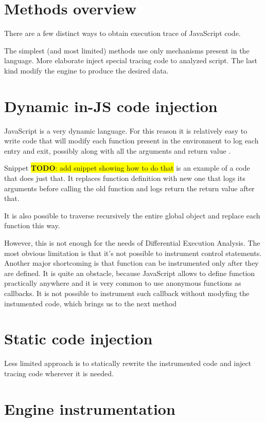 \documentclass[en]{pracamgr}
\newcommand{\todo}[1]{\colorbox{yellow}{ \color{red} \textbf{TODO}: {#1}}}
\begin{document}
\section{Methods overview}
There are a few distinct ways to obtain execution trace of JavaScript code. 

The simplest (and most limited) methods use only mechanisms present in the language.
More elaborate inject special tracing code to analyzed script. The last kind modify the engine to produce
the desired data.

\section{Dynamic in-JS code injection}
JavaScript is a very dynamic language. For this reason it is relatively easy to write code that will
modify each function present in the environment to log each entry and exit,
possibly along with all the arguments and return value \cite{stack:js-console-log}.

Snippet \todo{add snippet showing how to do that} is an example of a code that does just that.
It replaces function definition with new one that logs its arguments before calling the old function and logs return
the return value after that. 

It is also possible to traverse recursively the entire global object and replace each function this way.

However, this is not enough for the needs of Differential Execution Analysis. 
The most obvious limitation is that it's not possible to instrument control statements.
Another major shortcoming is that function can be instrumented only after they are defined. 
It is quite an obstacle, because JavaScript allows to define function practically anywhere and it is very common
to use anonymous functions as callbacks. It is not possible to instrument such callback 
without modyfing the instumented code, which brings us to the next method

\section{Static code injection}
Less limited approach is to statically rewrite the instrumented code and inject tracing code wherever it is needed.


\section{Engine instrumentation}
\end{document}
